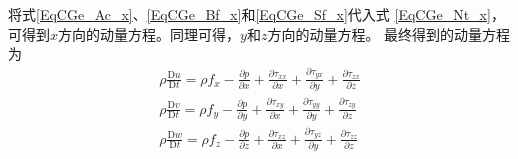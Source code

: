 将式\eqref{EqCGe_Ac_x}、\eqref{EqCGe_Bf_x}和\eqref{EqCGe_Sf_x}代入式
\eqref{EqCGe_Nt_x}，可得到$x$方向的动量方程。同理可得，$y$和$z$方向的动量方程。
最终得到的动量方程为
\begin{equation}
  \begin{aligned}
    \rho \frac{\mathrm{D}u}{\mathrm{D}t} =
    \rho f_{x}
    -\frac{\partial p}{\partial x}
    +\frac{\partial \tau_{xx}}{\partial x}
    +\frac{\partial \tau_{yx}}{\partial y}
    +\frac{\partial \tau_{zx}}{\partial z}
    \\
    \rho \frac{\mathrm{D}v}{\mathrm{D}t} =
    \rho f_{y}
    -\frac{\partial p}{\partial y}
    +\frac{\partial \tau_{xy}}{\partial x}
    +\frac{\partial \tau_{yy}}{\partial y}
    +\frac{\partial \tau_{zy}}{\partial z}
    \\
    \rho \frac{\mathrm{D}w}{\mathrm{D}t} =
    \rho f_{z}
    -\frac{\partial p}{\partial z}
    +\frac{\partial \tau_{xz}}{\partial x}
    +\frac{\partial \tau_{yz}}{\partial y}
    +\frac{\partial \tau_{zz}}{\partial z}
  \end{aligned}
  \label{EqCGe_NS_Me_ori}
\end{equation}

